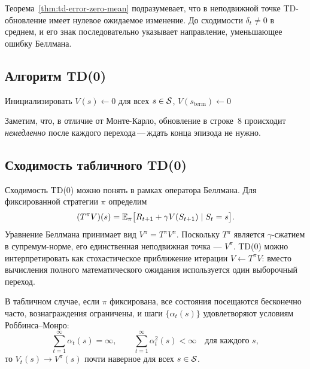 Теорема~\ref{thm:td-error-zero-mean} подразумевает, что в неподвижной точке TD-обновление имеет нулевое ожидаемое изменение.  До сходимости $\delta_t \ne 0$ в среднем, и его знак последовательно указывает направление, уменьшающее ошибку Беллмана.

\subsection{Алгоритм TD(0)}

\begin{algorithm}[ht]
\caption{TD(0) для оценивания стратегии}
\label{alg:td0}
\KwIn{Стратегия $\pi$, шаг $\alpha\in(0,1]$, дисконт $\gamma\in[0,1)$}
Инициализировать $V(s) \leftarrow 0$ для всех $s \in \mathcal{S}$, $V(s_{\mathrm{term}}) \leftarrow 0$\;
\end{algorithm}

Заметим, что, в отличие от Монте-Карло, обновление в строке~8 происходит \emph{немедленно} после каждого перехода\,---\,ждать конца эпизода не нужно.

\subsection{Сходимость табличного TD(0)}

Сходимость TD(0) можно понять в рамках оператора Беллмана.  Для фиксированной стратегии $\pi$ определим
\[
(T^\pi V)(s) = \operatorname{\mathbb{E}}_\pi\bigl[R_{t+1} + \gamma V(S_{t+1}) \mid S_t = s\bigr].
\]
Уравнение Беллмана принимает вид $V^\pi = T^\pi V^\pi$.  Поскольку $T^\pi$ является $\gamma$-сжатием в супремум-норме, его единственная неподвижная точка --- $V^\pi$.  TD(0) можно интерпретировать как стохастическое приближение итерации $V \leftarrow T^\pi V$: вместо вычисления полного математического ожидания используется один выборочный переход.

\begin{theorem}
\label{thm:td0-convergence}
В табличном случае, если $\pi$ фиксирована, все состояния посещаются бесконечно часто, вознаграждения ограничены, и шаги $\{\alpha_t(s)\}$ удовлетворяют условиям Роббинса--Монро:
\begin{equation}
\label{eq:rm-conditions}
\sum_{t=1}^{\infty}\alpha_t(s) = \infty, \qquad \sum_{t=1}^{\infty}\alpha_t^2(s) < \infty \quad \mbox{для каждого } s,
\end{equation}
то $V_t(s) \to V^\pi(s)$ почти наверное для всех $s\in\mathcal{S}$.
\end{theorem}

